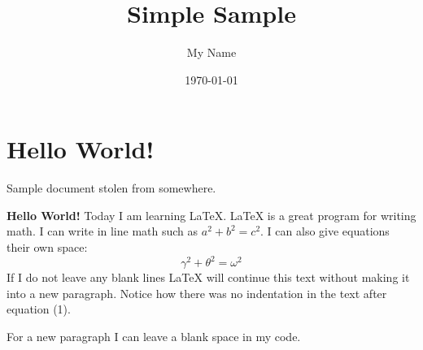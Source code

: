 \documentclass{article}
\title{Simple Sample}
\author{My Name}
\date{\today}
\begin{document}
    \maketitle

    \section{Hello World!}

    Sample document stolen from somewhere.

    \textbf{Hello World!} Today I am learning \LaTeX.
    \LaTeX{} is a great program for writing math. I can write in line math such as $a^2+b^2=c^2$.
    I can also give equations their own space:
    \begin{equation}
        \gamma^2+\theta^2=\omega^2
    \end{equation}
    If I do not leave any blank lines \LaTeX{} will continue  this text without making it into a new paragraph.
    Notice how there was no indentation in the text after equation (1).

    For a new paragraph I can leave a blank space in my code.
\end{document}
